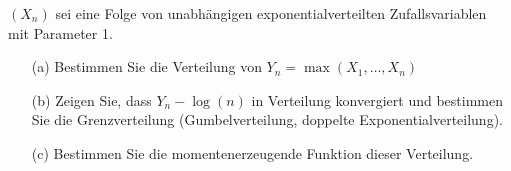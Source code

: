 \begin{exercise}
$(X_n)$ sei eine Folge von unabhängigen exponentialverteilten Zufallsvariablen
mit Parameter 1.

\begin{itemize}
  \item[(a)] Bestimmen Sie die Verteilung von $Y_n = \max(X_1,\dots,X_n)$
  \item[(b)] Zeigen Sie, dass $Y_n - \log(n)$ in Verteilung konvergiert und bestimmen Sie die Grenzverteilung (Gumbelverteilung, doppelte Exponentialverteilung).
  \item[(c)] Bestimmen Sie die momentenerzeugende Funktion dieser Verteilung.
\end{itemize}

\end{exercise}


